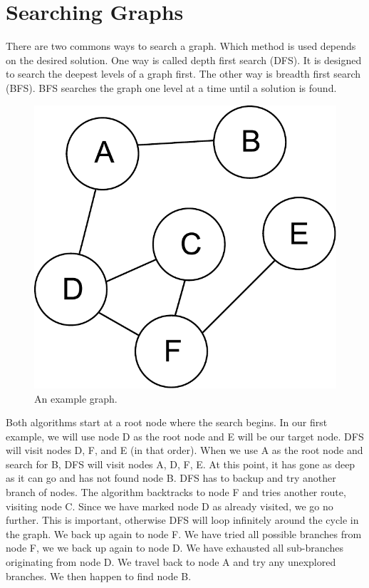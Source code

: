 \label{lab:SixDegreesKevinBacon}

\section*{Searching Graphs}
There are two commons ways to search a graph.
Which method is used depends on the desired solution.
One way is called depth first search (DFS).  It is designed to search the deepest levels of a graph first.
The other way is breadth first search (BFS).  BFS searches the graph one level at a time until a solution is found.
\begin{figure}[h]
\centering
\includegraphics[width=.5\textwidth]{graph.pdf}
\caption{An example graph.}
\label{fig:bfs_dfs_graph}
\end{figure}

Both algorithms start at a root node where the search begins.
In our first example, we will use node D as the root node and E will be our target node.
DFS will visit nodes D, F, and E (in that order).
When we use A as the root node and search for B, DFS will visit nodes A, D, F, E.
At this point, it has gone as deep as it can go and has not found node B.
DFS has to backup and try another branch of nodes.
The algorithm backtracks to node F and tries another route, visiting node C.
Since we have marked node D as already visited, we go no further.
This is important, otherwise DFS will loop infinitely around the cycle in the graph.
We back up again to node F.  We have tried all possible branches from node F, we we back up again to node D.
We have exhausted all sub-branches originating from node D.
We travel back to node A and try any unexplored branches.
We then happen to find node B.

